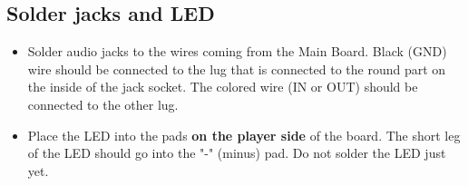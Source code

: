 \documentclass[a4paper,12pt]{article}
\begin{document}
\restoregeometry{}

\subsection{Solder jacks and LED}

\begin{itemize}
  \item Solder audio jacks to the wires coming from the Main
    Board. Black (GND) wire should be connected to the lug
    that is connected to the round part on the inside of the
    jack socket. The colored wire (IN or OUT) should be
    connected to the other lug.
  \item Place the LED into the pads \textbf{on the player
    side} of the board. The short leg of the LED should go
    into the "-" (minus) pad. Do not solder the LED just
    yet.
\end{itemize}
\end{document}
